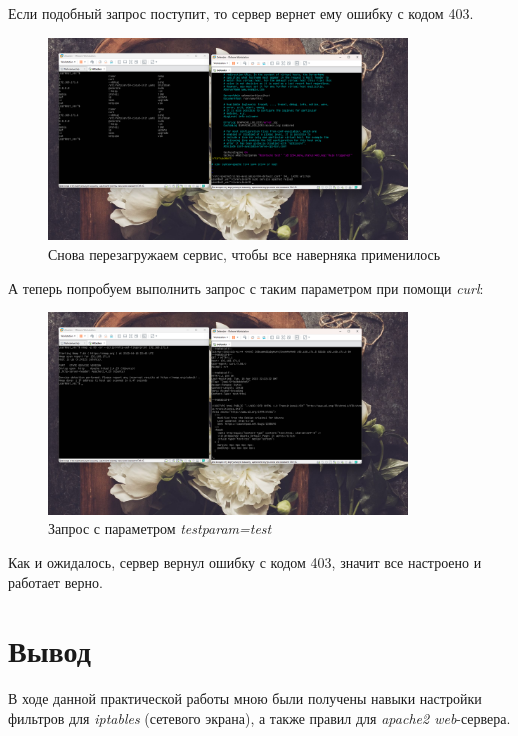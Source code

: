 \documentclass[a4paper]{article}
\begin{document}
  Если подобный запрос поступит, то сервер вернет ему ошибку с кодом 403.

  \begin{figure}[H]
    \centering
    \includegraphics[width=0.85\textwidth]{03_00 (69)}
    \caption{Снова перезагружаем сервис, чтобы все наверняка применилось}
    \label{img:69}
  \end{figure}

  А теперь попробуем выполнить запрос с таким параметром при помощи \textit{curl}:

  \begin{figure}[H]
    \centering
    \includegraphics[width=0.85\textwidth]{03_00 (71)}
    \caption{Запрос с параметром \textit{testparam=test}}
    \label{img:71}
  \end{figure}

  Как и ожидалось, сервер вернул ошибку с кодом 403, значит все настроено и работает верно.

  \section{Вывод}

  В ходе данной практической работы мною были получены навыки настройки фильтров
  для \textit{iptables} (сетевого экрана), а также правил для \textit{apache2 web}-сервера.
\end{document}
